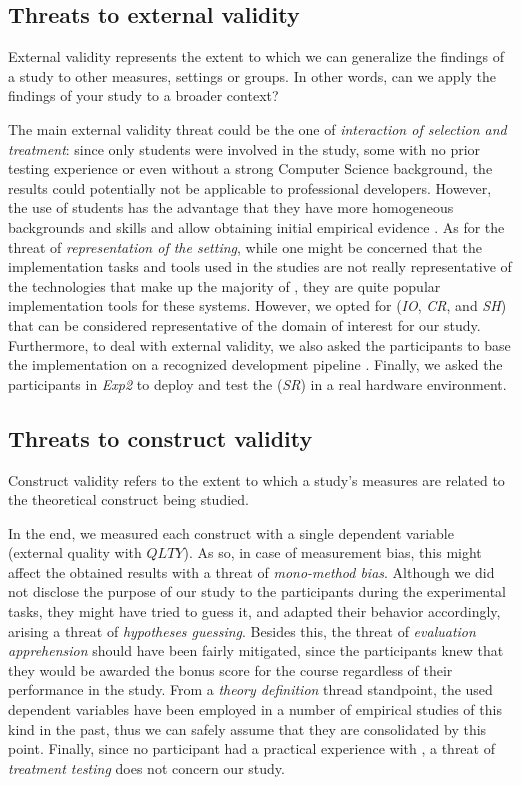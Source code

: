 \subsection{Threats to external validity}
External validity represents the extent to which we can generalize the findings of a study to other measures, settings or groups. In other words, can we apply the findings of your study to a broader context?

The main external validity threat could be the one of \textit{interaction of selection and treatment}: since only students were involved in the study, some with no prior testing experience or even without a strong Computer Science background, the results could potentially not be applicable to professional developers. 
However, the use of students has the advantage that they have more homogeneous backgrounds and skills and allow obtaining initial empirical evidence \cite{DBLP:conf/metrics/CarverJMS03, DBLP:journals/ese/HostRW00}.
As for the threat of \textit{representation of the setting}, while one might be concerned that the implementation tasks and tools used in the studies are not really representative of the technologies that make up the majority of \ess, they are quite popular implementation tools for these systems. 
However, we opted for \ess (\ie \textit{IO}, \textit{CR}, and \textit{SH}) that can be considered representative of the domain of interest for our study. Furthermore, to deal with external validity, we also asked the participants to base the \ess implementation on a recognized development pipeline \cite{TDDEC}. Finally, we asked the participants in \textit{Exp2} to deploy and test the \es (\ie \textit{SR}) in a real hardware environment.

\subsection{Threats to construct validity}
Construct validity refers to the extent to which a study's measures are related to the theoretical construct being studied.

In the end, we measured each construct with a single dependent variable (\eg external quality with $QLTY$). As so, in case of measurement bias,
this might affect the obtained results with a threat of \textit{mono-method bias}. 
Although we did not disclose the purpose of our study to the participants during the experimental tasks, they might have tried to guess it, and adapted their behavior accordingly, arising a threat of \textit{hypotheses guessing}. 
Besides this, the threat of \textit{evaluation apprehension} should have been fairly mitigated, since the participants knew that they would be awarded the bonus score for the course regardless of their performance in the study.
From a \textit{theory definition} thread standpoint, the used dependent variables have been employed in a number of empirical studies of this kind in the past, thus we can safely assume that they are consolidated by this point. Finally, since no participant had a practical experience with \tdd, a threat of \textit{treatment testing} does not concern our study.


